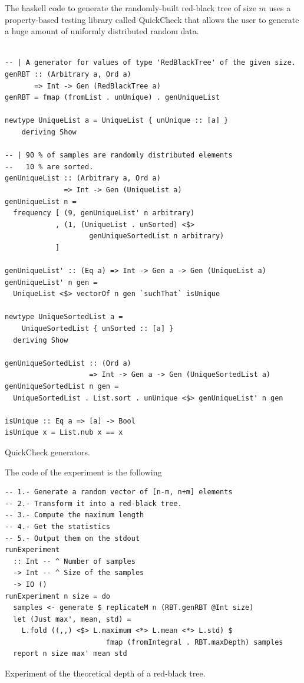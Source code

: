 \documentclass[12pt, a4paper]{article} %
\begin{document}
The haskell code to generate the randomly-built red-black tree of size $m$ uses a property-based testing library called QuickCheck \cite{quickcheck} that allows the user to generate a huge amount of uniformly distributed random data.

\begin{listing}[H]
  \begin{verbatim}

-- | A generator for values of type 'RedBlackTree' of the given size.
genRBT :: (Arbitrary a, Ord a)
       => Int -> Gen (RedBlackTree a)
genRBT = fmap (fromList . unUnique) . genUniqueList

newtype UniqueList a = UniqueList { unUnique :: [a] }
    deriving Show

-- | 90 % of samples are randomly distributed elements
--   10 % are sorted.
genUniqueList :: (Arbitrary a, Ord a)
              => Int -> Gen (UniqueList a)
genUniqueList n =
  frequency [ (9, genUniqueList' n arbitrary)
            , (1, (UniqueList . unSorted) <$>
                    genUniqueSortedList n arbitrary)
            ]

genUniqueList' :: (Eq a) => Int -> Gen a -> Gen (UniqueList a)
genUniqueList' n gen =
  UniqueList <$> vectorOf n gen `suchThat` isUnique

newtype UniqueSortedList a =
    UniqueSortedList { unSorted :: [a] }
  deriving Show

genUniqueSortedList :: (Ord a)
                    => Int -> Gen a -> Gen (UniqueSortedList a)
genUniqueSortedList n gen =
  UniqueSortedList . List.sort . unUnique <$> genUniqueList' n gen

isUnique :: Eq a => [a] -> Bool
isUnique x = List.nub x == x

  \end{verbatim}
  \caption{QuickCheck generators.}
  \label{lst:quickcheck}
\end{listing}

The code of the experiment is the following

\begin{listing}[H]
  \begin{verbatim}
-- 1.- Generate a random vector of [n-m, n+m] elements
-- 2.- Transform it into a red-black tree.
-- 3.- Compute the maximum length
-- 4.- Get the statistics
-- 5.- Output them on the stdout
runExperiment
  :: Int -- ^ Number of samples
  -> Int -- ^ Size of the samples
  -> IO ()
runExperiment n size = do
  samples <- generate $ replicateM n (RBT.genRBT @Int size)
  let (Just max', mean, std) =
    L.fold ((,,) <$> L.maximum <*> L.mean <*> L.std) $
                        fmap (fromIntegral . RBT.maxDepth) samples
  report n size max' mean std

  \end{verbatim}
  \caption{Experiment of the theoretical depth of a red-black tree.}
  \label{lst:experiment}
\end{listing}
\end{document}

